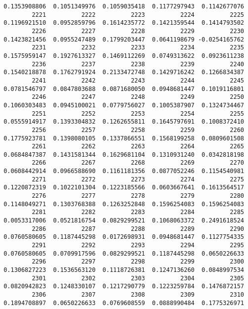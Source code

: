 \documentclass[
  letterpaper,
  DIV=11,
  numbers=noendperiod]{scrreprt}
\begin{document}
\begin{verbatim}
 0.1353908806  0.1051349976  0.1059035418  0.1177297943  0.1142677076 
         2221          2222          2223          2224          2225 
 0.1196921510  0.0952859796  0.1614235772  0.1421359544  0.1414793502 
         2226          2227          2228          2229          2230 
 0.1423821456  0.0955247489  0.1799203447  0.0641198679 -0.0254165762 
         2231          2232          2233          2234          2235 
 0.1575959147  0.1927613327  0.1469112269  0.0749313622  0.0923611238 
         2236          2237          2238          2239          2240 
 0.1540218878  0.1762791924  0.2133472748  0.1429716242  0.1266834387 
         2241          2242          2243          2244          2245 
 0.0781546797  0.0847803688  0.0871680050  0.0948681447  0.1019116801 
         2246          2247          2248          2249          2250 
 0.1060303483  0.0945100021  0.0779756027  0.1005387907  0.1324734467 
         2251          2252          2253          2254          2255 
 0.0555914917  0.1393304832  0.1262655811  0.1645797691  0.1008372410 
         2256          2257          2258          2259          2260 
 0.1775923781  0.1398080105  0.1337866551  0.1568199258  0.0809601508 
         2261          2262          2263          2264          2265 
 0.0684847387  0.1431581344  0.1629681104  0.1310931240  0.0342818198 
         2266          2267          2268          2269          2270 
 0.0608442914  0.0966588690  0.1161181356  0.0877052246  0.1154540981 
         2271          2272          2273          2274          2275 
 0.1220872319  0.1022101304  0.1223185566  0.0603667641  0.1613564517 
         2276          2277          2278          2279          2280 
 0.1148049271  0.1303768388  0.1263252848  0.1596254083  0.1596254083 
         2281          2282          2283          2284          2285 
 0.0053317006  0.0521816754  0.0829299521  0.1068063372  0.2491618524 
         2286          2287          2288          2289          2290 
 0.0760580605  0.1187445298  0.0172698931  0.0948681447  0.1127754335 
         2291          2292          2293          2294          2295 
 0.0760580605  0.0709917596  0.0829299521  0.1187445298  0.0650226633 
         2296          2297          2298          2299          2300 
 0.1306827223  0.1536563120  0.1118726381  0.1247136260  0.0848997534 
         2301          2302          2303          2304          2305 
 0.0820942823  0.1248330107  0.1217290779  0.1223259784  0.1476872157 
         2306          2307          2308          2309          2310 
 0.1894708897  0.0650226633  0.0769608559  0.0888990484  0.1775326971 

\end{verbatim}
\end{document}
